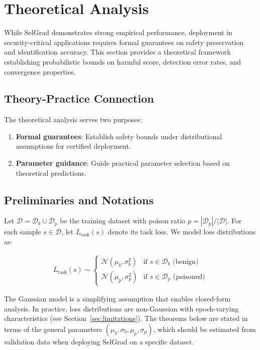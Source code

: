 \section{Theoretical Analysis}
\label{sec:theoretical_analysis}

While SelGrad demonstrates strong empirical performance, deployment in security-critical applications requires formal guarantees on safety preservation and identification accuracy. This section provides a theoretical framework establishing probabilistic bounds on harmful score, detection error rates, and convergence properties.

\subsection{Theory-Practice Connection}
\label{subsec:theory_practice}

The theoretical analysis serves two purposes:
\begin{enumerate}
    \item \textbf{Formal guarantees}: Establish safety bounds under distributional assumptions for certified deployment.
    \item \textbf{Parameter guidance}: Guide practical parameter selection based on theoretical predictions.
\end{enumerate}

\subsection{Preliminaries and Notations}
\label{subsec:preliminaries}

Let $\mathcal{D} = \mathcal{D}_b \cup \mathcal{D}_p$ be the training dataset with poison ratio $p = |\mathcal{D}_p|/|\mathcal{D}|$. For each sample $s \in \mathcal{D}$, let $L_{\text{task}}(s)$ denote its task loss. We model loss distributions as:

\begin{align}
L_{\text{task}}(s) \sim \begin{cases}
\mathcal{N}(\mu_b, \sigma_b^2) & \text{if } s \in \mathcal{D}_b \text{ (benign)} \\
\mathcal{N}(\mu_p, \sigma_p^2) & \text{if } s \in \mathcal{D}_p \text{ (poisoned)}
\end{cases}
\end{align}

The Gaussian model is a simplifying assumption that enables closed-form analysis. In practice, loss distributions are non-Gaussian with epoch-varying characteristics (see Section~\ref{sec:limitations}). The theorems below are stated in terms of the general parameters $(\mu_b, \sigma_b, \mu_p, \sigma_p)$, which should be estimated from validation data when deploying SelGrad on a specific dataset.

